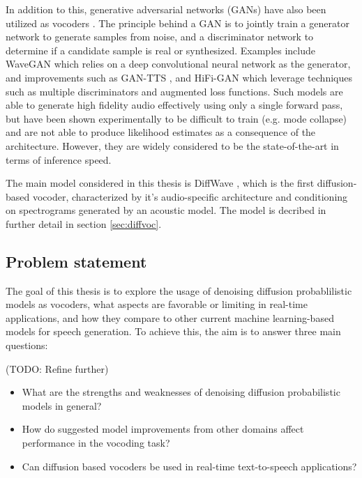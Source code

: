 \documentclass{article}
\begin{document}
In addition to this, generative adversarial networks (GANs) have also been utilized as vocoders \cite{goodfellow2020generative}. The principle behind a GAN is to jointly train a generator network to generate samples from noise, and a discriminator network to determine if a candidate sample is real or synthesized. Examples include WaveGAN \cite{donahue2018adversarial} which relies on a deep convolutional neural network as the generator, and improvements such as GAN-TTS \cite{binkowski2019high}, and HiFi-GAN \cite{kong2020hifi} which leverage techniques such as multiple discriminators and augmented loss functions. Such models are able to generate high fidelity audio effectively using only a single forward pass, but have been shown experimentally to be difficult to train (e.g. mode collapse) and are not able to produce likelihood estimates as a consequence of the architecture. However, they are widely considered to be the state-of-the-art in terms of inference speed.

The main model considered in this thesis is DiffWave \cite{kong2020diffwave}, which is the first diffusion-based vocoder, characterized by it's audio-specific architecture and conditioning on spectrograms generated by an acoustic model. The model is decribed in further detail in section \ref{sec:diffvoc}.

\subsection{Problem statement}

The goal of this thesis is to explore the usage of denoising diffusion probablilistic models as vocoders, what aspects are favorable or limiting in real-time applications, and how they compare to other current machine learning-based models for speech generation. To achieve this, the aim is to answer three main questions:

(TODO: Refine further)

\begin{itemize}
    \item What are the strengths and weaknesses of denoising diffusion probabilistic models in general?
    \item How do suggested model improvements from other domains affect performance in the vocoding task?
    \item Can diffusion based vocoders be used in real-time text-to-speech applications?
\end{itemize}

\newpage
\end{document}
